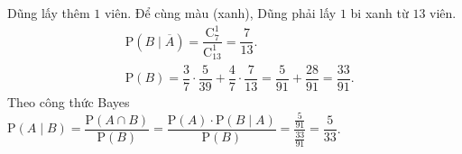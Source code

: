 \begin{ex}
{\begin{itemchoice}
			Dũng lấy thêm $1$ viên. Để cùng màu (xanh), Dũng phải lấy $1$ bi xanh từ $13$ viên.
			\allowdisplaybreaks
			\begin{eqnarray*}
				&\mathrm{P}(B \mid \overline{A}) = \dfrac{\mathrm{C}_7^1}{\mathrm{C}_{13}^1} = \dfrac{7}{13}.\\
				&\mathrm{P}(B) = \dfrac{3}{7} \cdot \dfrac{5}{39} + \dfrac{4}{7} \cdot \dfrac{7}{13} = \dfrac{5}{91} + \dfrac{28}{91} = \dfrac{33}{91}.
			\end{eqnarray*}
			Theo công thức Bayes
			$\mathrm{P}(A \mid B) = \dfrac{\mathrm{P}(A \cap B)}{\mathrm{P}(B)} = \dfrac{\mathrm{P}(A) \cdot \mathrm{P}(B \mid A)}{\mathrm{P}(B)} = \dfrac{\frac{5}{91}}{\frac{33}{91}} = \dfrac{5}{33}$.
		\end{itemchoice}
	}
\end{ex}


